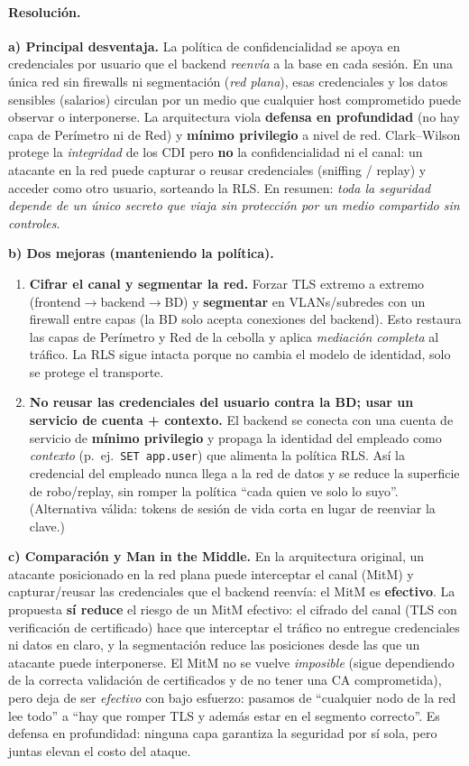 \paragraph{Resolución.}
\textbf{a) Principal desventaja.} La política de confidencialidad se apoya en credenciales por usuario que el backend \emph{reenvía} a la base en cada sesión. En una única red sin firewalls ni segmentación (\emph{red plana}), esas credenciales y los datos sensibles (salarios) circulan por un medio que cualquier host comprometido puede observar o interponerse. La arquitectura viola \textbf{defensa en profundidad} (no hay capa de Perímetro ni de Red) y \textbf{mínimo privilegio} a nivel de red. Clark--Wilson protege la \emph{integridad} de los CDI pero \textbf{no} la confidencialidad ni el canal: un atacante en la red puede capturar o reusar credenciales (sniffing / replay) y acceder como otro usuario, sorteando la RLS. En resumen: \emph{toda la seguridad depende de un único secreto que viaja sin protección por un medio compartido sin controles}.

\textbf{b) Dos mejoras (manteniendo la política).}
\begin{enumerate}
  \item \textbf{Cifrar el canal y segmentar la red.} Forzar TLS extremo a extremo (frontend$\to$backend$\to$BD) y \textbf{segmentar} en VLANs/subredes con un firewall entre capas (la BD solo acepta conexiones del backend). Esto restaura las capas de Perímetro y Red de la cebolla y aplica \emph{mediación completa} al tráfico. La RLS sigue intacta porque no cambia el modelo de identidad, solo se protege el transporte.
  \item \textbf{No reusar las credenciales del usuario contra la BD; usar un servicio de cuenta + contexto.} El backend se conecta con una cuenta de servicio de \textbf{mínimo privilegio} y propaga la identidad del empleado como \emph{contexto} (p.\ ej.\ \texttt{SET app.user}) que alimenta la política RLS. Así la credencial del empleado nunca llega a la red de datos y se reduce la superficie de robo/replay, sin romper la política ``cada quien ve solo lo suyo''. (Alternativa válida: tokens de sesión de vida corta en lugar de reenviar la clave.)
\end{enumerate}

\textbf{c) Comparación y Man in the Middle.} En la arquitectura original, un atacante posicionado en la red plana puede interceptar el canal (MitM) y capturar/reusar las credenciales que el backend reenvía: el MitM es \textbf{efectivo}. La propuesta \textbf{sí reduce} el riesgo de un MitM efectivo: el cifrado del canal (TLS con verificación de certificado) hace que interceptar el tráfico no entregue credenciales ni datos en claro, y la segmentación reduce las posiciones desde las que un atacante puede interponerse. El MitM no se vuelve \emph{imposible} (sigue dependiendo de la correcta validación de certificados y de no tener una CA comprometida), pero deja de ser \emph{efectivo} con bajo esfuerzo: pasamos de ``cualquier nodo de la red lee todo'' a ``hay que romper TLS y además estar en el segmento correcto''. Es defensa en profundidad: ninguna capa garantiza la seguridad por sí sola, pero juntas elevan el costo del ataque.

